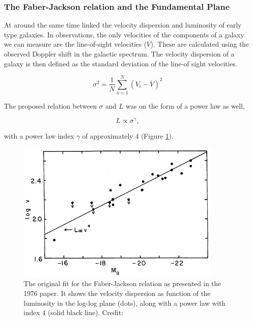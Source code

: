 \subsubsection{The Faber-Jackson relation and the Fundamental Plane}
At around the same time \textcite{TullyFisher1977} linked the velocity dispersion and luminosity of early type galaxies. In observations, the only velocities of the components of a galaxy we can measure are the line-of-sight velocities ($V$). These are calculated using the observed Doppler shift in the galactic spectrum. The velocity dispersion of a galaxy is then defined as the standard deviation of the line-of sight velocities.

\begin{equation} \label{standard_dev}
    \sigma^{2} = \frac{1}{N} \sum_{n=1}^{N} (V_{i} - \overline{V})^2
\end{equation}

The proposed relation between $\sigma$ and $L$ was on the form of a power law as well,

\begin{equation}
    L \propto \sigma^{\gamma},
\end{equation}

with a power law index $\gamma$ of approximately 4 (Figure \ref{faber_jackson}).

\begin{figure}
    \centering
    \includegraphics[width=0.9\textwidth]{images/faber_jackson.png}
    \caption{The original fit for the Faber-Jackson relation as presented in the 1976 paper. It shows the velocity dispersion as function of the luminosity in the log-log plane (dots), along with a power law with index 4 (solid black line). Credit: \parencite{TullyFisher1977}}
    \label{faber_jackson}
\end{figure}

